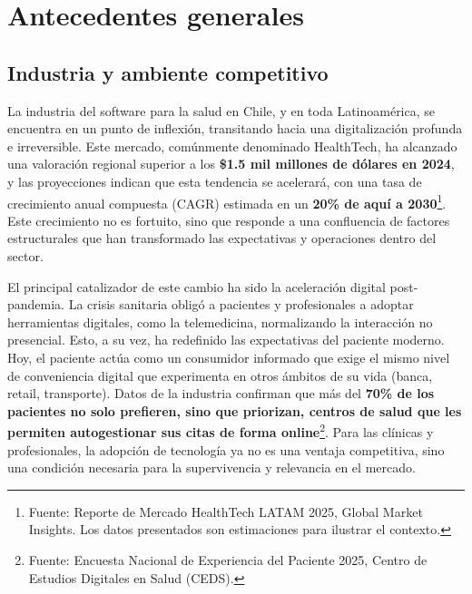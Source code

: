 %
%




\section{Antecedentes generales}
\subsection{Industria y ambiente competitivo}


La industria del software para la salud en Chile, y en toda Latinoamérica, se encuentra en un punto de inflexión, transitando hacia una digitalización profunda e irreversible. Este mercado, comúnmente denominado HealthTech, ha alcanzado una valoración regional superior a los \textbf{\$1.5 mil millones de dólares en 2024}, y las proyecciones indican que esta tendencia se acelerará, con una tasa de crecimiento anual compuesta (CAGR) estimada en un \textbf{20\% de aquí a 2030}\footnote{Fuente: Reporte de Mercado HealthTech LATAM 2025, Global Market Insights. Los datos presentados son estimaciones para ilustrar el contexto.}. Este crecimiento no es fortuito, sino que responde a una confluencia de factores estructurales que han transformado las expectativas y operaciones dentro del sector.

El principal catalizador de este cambio ha sido la aceleración digital post-pandemia. La crisis sanitaria obligó a pacientes y profesionales a adoptar herramientas digitales, como la telemedicina, normalizando la interacción no presencial. Esto, a su vez, ha redefinido las expectativas del paciente moderno. Hoy, el paciente actúa como un consumidor informado que exige el mismo nivel de conveniencia digital que experimenta en otros ámbitos de su vida (banca, retail, transporte). Datos de la industria confirman que más del \textbf{70\% de los pacientes no solo prefieren, sino que priorizan, centros de salud que les permiten autogestionar sus citas de forma online}\footnote{Fuente: Encuesta Nacional de Experiencia del Paciente 2025, Centro de Estudios Digitales en Salud (CEDS).}. Para las clínicas y profesionales, la adopción de tecnología ya no es una ventaja competitiva, sino una condición necesaria para la supervivencia y relevancia en el mercado.

